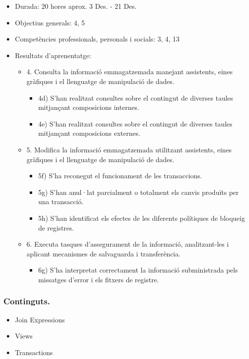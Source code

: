 \documentclass[catalan, a4paper, 12pt, titlepage]{article}
\begin{document}
  \begin{itemize}
	\item Durada: 20 hores aprox. 3 Des. - 21 Des.
	\item Objectius generals: 4, 5
	\item Competències professionals, personals i socials: 3, 4, 13
	\item Resultats d'aprenentatge: 
		\begin{itemize}
			\item 4. Consulta la informació emmagatzemada manejant assistents, eines gràfiques i el llenguatge de manipulació de dades.
				\begin{itemize}
					\item 4d) S'han realitzat consultes sobre el contingut de diverses taules mitjançant composicions internes.
					\item 4e) S'han realitzat consultes sobre el contingut de diverses taules mitjançant composicions externes.
				\end{itemize}
			\item 5. Modifica la informació emmagatzemada utilitzant assistents, eines gràfiques i el llenguatge de manipulació de dades.
				\begin{itemize}
					\item 5f) S'ha reconegut el funcionament de les transaccions.
					\item 5g) S'han anul·lat parcialment o totalment els canvis produïts per una transacció.
					\item 5h) S'han identificat els efectes de les diferents polítiques de bloqueig de registres.
				\end{itemize}
			\item 6. Executa tasques d'assegurament de la informació, analitzant-les i aplicant mecanismes de salvaguarda i transferència.
				\begin{itemize}
					\item 6g) S'ha interpretat correctament la informació subministrada pels missatges d'error i els fitxers de registre.
				\end{itemize}
		\end{itemize}
  \end{itemize}

  \subsubsection{Continguts.}

  \begin{itemize}
	  \item Join Expressions
	  \item Views
	  \item Transactions
  \end{itemize}
\end{document}

